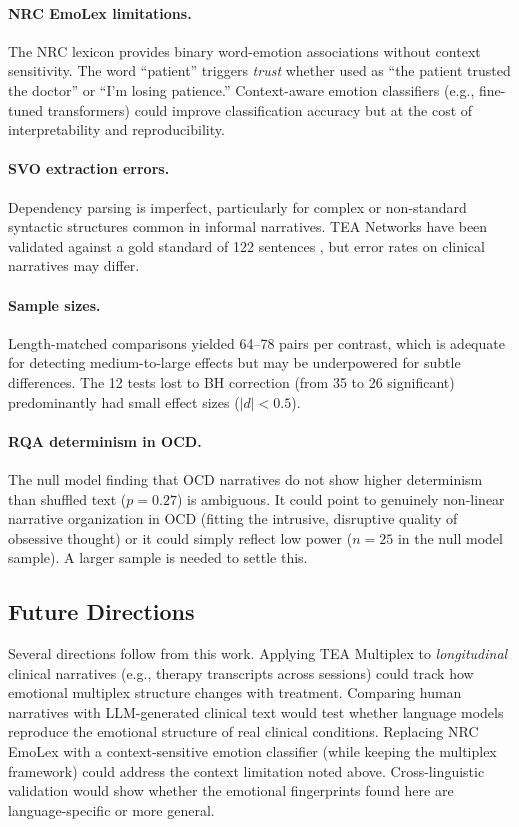 \documentclass[11pt,a4paper]{article}
\begin{document}
\paragraph{NRC EmoLex limitations.}  The NRC lexicon provides binary word-emotion associations without context sensitivity.  The word ``patient'' triggers \textit{trust} whether used as ``the patient trusted the doctor'' or ``I'm losing patience.''  Context-aware emotion classifiers (e.g., fine-tuned transformers) could improve classification accuracy but at the cost of interpretability and reproducibility.

\paragraph{SVO extraction errors.}  Dependency parsing is imperfect, particularly for complex or non-standard syntactic structures common in informal narratives.  TEA Networks have been validated against a gold standard of 122 sentences \citep{franchini2026tea}, but error rates on clinical narratives may differ.

\paragraph{Sample sizes.}  Length-matched comparisons yielded 64--78 pairs per contrast, which is adequate for detecting medium-to-large effects but may be underpowered for subtle differences.  The 12 tests lost to BH correction (from 35 to 26 significant) predominantly had small effect sizes ($|d| < 0.5$).

\paragraph{RQA determinism in OCD.}  The null model finding that OCD narratives do not show higher determinism than shuffled text ($p = 0.27$) is ambiguous.  It could point to genuinely non-linear narrative organization in OCD (fitting the intrusive, disruptive quality of obsessive thought) or it could simply reflect low power ($n=25$ in the null model sample).  A larger sample is needed to settle this.

\subsection{Future Directions}

Several directions follow from this work.  Applying TEA Multiplex to \textit{longitudinal} clinical narratives (e.g., therapy transcripts across sessions) could track how emotional multiplex structure changes with treatment.  Comparing human narratives with LLM-generated clinical text \citep{franchini2026tea} would test whether language models reproduce the emotional structure of real clinical conditions.  Replacing NRC EmoLex with a context-sensitive emotion classifier (while keeping the multiplex framework) could address the context limitation noted above.  Cross-linguistic validation would show whether the emotional fingerprints found here are language-specific or more general.
\end{document}
